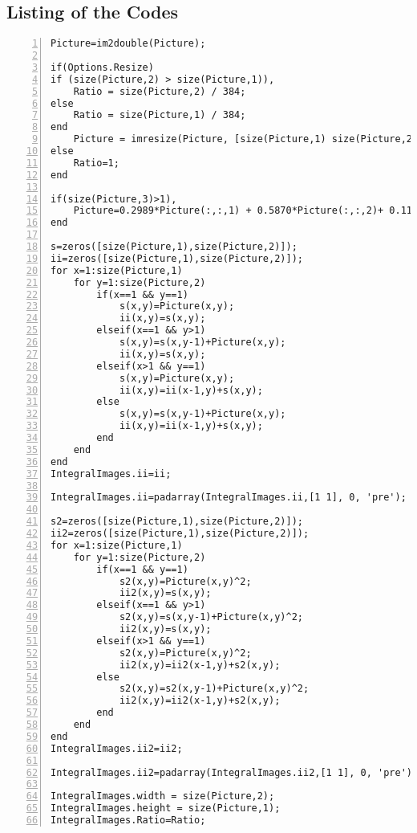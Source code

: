 \subsection{Listing of the Codes}

\begin{lstlisting}[style=Matlab-editor, numbers=left, label={lst:GetIntergralImages},captionpos=b, caption={Code \textbf{GetIntergralImages.m} }]
Picture=im2double(Picture);

if(Options.Resize)
if (size(Picture,2) > size(Picture,1)),
	Ratio = size(Picture,2) / 384;
else
	Ratio = size(Picture,1) / 384;
end
	Picture = imresize(Picture, [size(Picture,1) size(Picture,2) ]/ Ratio);
else
	Ratio=1;
end

if(size(Picture,3)>1),
	Picture=0.2989*Picture(:,:,1) + 0.5870*Picture(:,:,2)+ 0.1140*Picture(:,:,3);
end

s=zeros([size(Picture,1),size(Picture,2)]);
ii=zeros([size(Picture,1),size(Picture,2)]);
for x=1:size(Picture,1)
	for y=1:size(Picture,2)
		if(x==1 && y==1)
			s(x,y)=Picture(x,y);
			ii(x,y)=s(x,y);
		elseif(x==1 && y>1)
			s(x,y)=s(x,y-1)+Picture(x,y);
			ii(x,y)=s(x,y);
		elseif(x>1 && y==1)
			s(x,y)=Picture(x,y);
			ii(x,y)=ii(x-1,y)+s(x,y);
		else
			s(x,y)=s(x,y-1)+Picture(x,y);
			ii(x,y)=ii(x-1,y)+s(x,y);
		end
	end
end
IntegralImages.ii=ii;

IntegralImages.ii=padarray(IntegralImages.ii,[1 1], 0, 'pre');

s2=zeros([size(Picture,1),size(Picture,2)]);
ii2=zeros([size(Picture,1),size(Picture,2)]);
for x=1:size(Picture,1)
	for y=1:size(Picture,2)
		if(x==1 && y==1)
			s2(x,y)=Picture(x,y)^2;
			ii2(x,y)=s(x,y);
		elseif(x==1 && y>1)
			s2(x,y)=s(x,y-1)+Picture(x,y)^2;
			ii2(x,y)=s(x,y);
		elseif(x>1 && y==1)
			s2(x,y)=Picture(x,y)^2;
			ii2(x,y)=ii2(x-1,y)+s2(x,y);
		else
			s2(x,y)=s2(x,y-1)+Picture(x,y)^2;
			ii2(x,y)=ii2(x-1,y)+s2(x,y);
		end
	end
end
IntegralImages.ii2=ii2;

IntegralImages.ii2=padarray(IntegralImages.ii2,[1 1], 0, 'pre');

IntegralImages.width = size(Picture,2);
IntegralImages.height = size(Picture,1);
IntegralImages.Ratio=Ratio;
\end{lstlisting}

